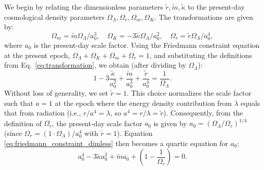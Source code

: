 \documentclass[%
 reprint,
 amsmath,amssymb,
 prd, %
]{revtex4-2}
\begin{document}
We begin by relating the dimensionless parameters $\tilde r, \tilde m, \tilde \kappa$ to the present-day cosmological density parameters $\Omega_\Lambda, \Omega_r, \Omega_m, \Omega_K$. %
The transformations are given by:
\begin{equation}\label{eq:transformation}
    \Omega_m=\tilde m\Omega_\Lambda/a_0^3,\quad \Omega_K=-3\tilde \kappa\Omega_\Lambda/a_0^2,\quad \Omega_r=\tilde r\Omega_\Lambda/a_0^4,
\end{equation}
where $a_0$ is the present-day scale factor.
Using the Friedmann constraint equation at the present epoch, $\Omega_\Lambda+\Omega_K+\Omega_m+\Omega_r=1$, and substituting the definitions from Eq.~\eqref{eq:transformation}, we obtain (after dividing by $\Omega_\Lambda$): %
\begin{equation}\label{eq:friedmann_constraint_dimless}
    1-3\frac{\tilde\kappa}{a_0^2}+\frac{\tilde m}{a_0^3}+\frac{\tilde r}{a_0^4}=\frac{1}{\Omega_\Lambda}.
\end{equation}
Without loss of generality, we set $\tilde r=1$. This choice normalizes the scale factor such that $a=1$ at the epoch where the energy density contribution from $\lambda$ equals that from radiation (i.e., $r/a^4 = \lambda$, so $a^4 = r/\lambda = \tilde r$). %
Consequently, from the definition of $\Omega_r$, the present-day scale factor $a_0$ is given by $a_0=(\Omega_\Lambda/\Omega_r)^{1/4}$ (since $\Omega_r = (1 \cdot \Omega_\Lambda)/a_0^4$ with $\tilde r=1$).
Equation \eqref{eq:friedmann_constraint_dimless} then becomes a quartic equation for $a_0$: %
\[
a_0^4 -3\tilde\kappa a_0^2+\tilde ma_0 +\left(1-\frac{1}{\Omega_r}\right)=0. %
\]
\end{document}
